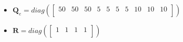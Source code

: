 \documentclass{thesisreport}
\begin{document}
\begin{itemize}
	\item $\bm{Q}_e = diag(
	\begin{bmatrix}
			50 & 50 & 50 & 5 & 5 & 5 & 5 & 10 & 10 & 10\\
	\end{bmatrix})$
	
	\item $\bm{R} =diag(
	\begin{bmatrix}
			1 & 1 & 1 & 1\\
	\end{bmatrix}) $
	
	
\end{itemize}
\end{document}
